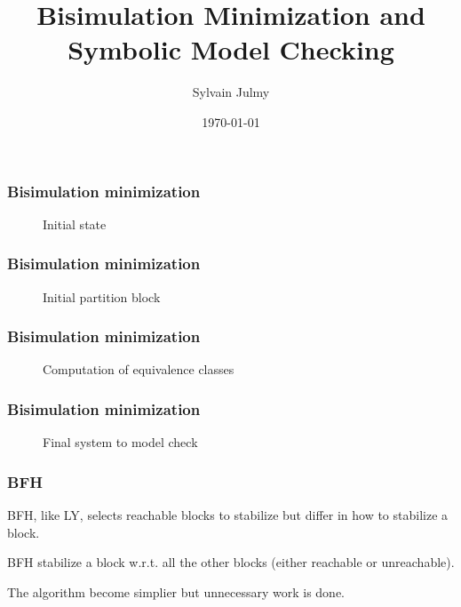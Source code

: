 \documentclass[11pt,handout]{beamer}
\title[Computer Chess]{Bisimulation Minimization and Symbolic Model Checking}
\author{Sylvain Julmy}
\date{\today}
\begin{document}
\maketitle

\begin{frame}[fragile]
  \frametitle{Bisimulation minimization}
  \begin{figure}[h]
  \centering
  \fbox{}
  \caption{Initial state}
  \label{fig:bisimulation_minimization_1}
\end{figure}
\end{frame}

\begin{frame}[fragile]
  \frametitle{Bisimulation minimization}
  \begin{figure}[h]
  \centering
  \fbox{}
  \caption{Initial partition block}
  \label{fig:bisimulation_minimization_2}
\end{figure}
\end{frame}

\begin{frame}[fragile]
  \frametitle{Bisimulation minimization}
  \begin{figure}[h]
  \centering
  \fbox{}
  \caption{Computation of equivalence classes}
  \label{fig:bisimulation_minimization_3}
\end{figure}
\end{frame}

\begin{frame}[fragile]
  \frametitle{Bisimulation minimization}
  \begin{figure}[h]
  \centering
  \fbox{}
  \caption{Final system to model check}
  \label{fig:bisimulation_minimization_4}
\end{figure}
\end{frame}

\begin{frame}
  \frametitle{BFH}
  BFH, like LY, selects reachable blocks to stabilize but differ in how to
  stabilize a block.

  \pause
  \vspace*{0.5cm}
  
  BFH stabilize a block w.r.t. all the other blocks (either reachable or
  unreachable).
  
  \pause
  \vspace*{0.5cm}
  
  The algorithm become simplier but unnecessary work is done.
\end{frame}
\end{document}
